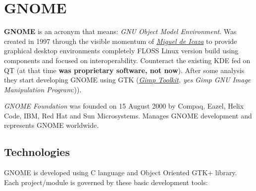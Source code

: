 \section{GNOME}
\label{sec:gnome}

\par \textbf{GNOME} is an acronym that means: \textit{GNU Object Model Environment}. Was created in 1997 through the visible momentum of \textit{\href{http://tirania.org/blog/}{Miguel de Icaza}} to provide graphical desktop environments completely FLOSS Linux version build using components and focused on interoperability. Counteract the existing KDE fed on QT (at that time \textbf{was proprietary software, not now}). After some analysis they start developing GNOME using GTK (\textit{\href{http://www.gimp.org/}{Gimp Toolkit}, yes Gimp GNU Image Manipulation Program}:)).

\par \textit{GNOME Foundation} was founded on 15 August 2000 by Compaq, Eazel, Helix Code, IBM, Red Hat and Sun Microsystems. Manages GNOME development and represents GNOME worldwide.

\subsection{Technologies}

\par GNOME is developed using C language and Object Oriented GTK+ library. Each project/module is governed by these basic development tools:

